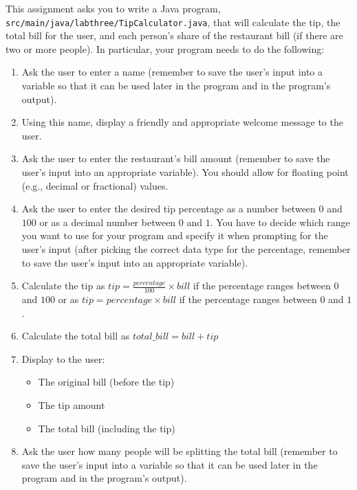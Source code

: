 \documentclass[11pt]{article}
\newcommand{\mainprogramsource}{\lstinline{src/main/java/labthree/TipCalculator.java}}
\begin{document}
This assignment asks you to write a Java program, \mainprogramsource{}, that will calculate the tip, the total bill for
the user, and each person's share of the restaurant bill (if there are two or more people). In particular, your program
needs to do the following:

\vspace*{-.1in}
\begin{enumerate}

  \item Ask the user to enter a name (remember to save the user's input into a variable so that it can be used later in
    the program and in the program's output).

  \item Using this name, display a friendly and appropriate welcome message to the user.

  \item Ask the user to enter the restaurant's bill amount (remember to save the user's input into an appropriate
    variable). You should allow for floating point (e.g., decimal or fractional) values.

  \item Ask the user to enter the desired tip percentage as a number between $0$ and $100$ or as a decimal number between
    $0$ and $1$. You have to decide which range you want to use for your program and specify it when prompting for the
    user's input (after picking the correct data type for the percentage, remember to save the user's input into an
    appropriate variable).

  \item Calculate the tip as $tip = \frac{percentage}{100} \times bill$ if the percentage ranges between $0$ and $100$ or
    as $tip = percentage \times bill$ if the percentage ranges between $0$ and $1$.

  \item Calculate the total bill as $total\_bill = bill+tip$

  \item Display to the user:
    \begin{itemize}
      \item The original bill (before the tip)
      \item The tip amount
      \item The total bill (including the tip)
    \end{itemize}

  \item Ask the user how many people will be splitting the total bill (remember to save the user's input into a variable
    so that it can be used later in the program and in the program's output).


\end{enumerate}
\end{document}

